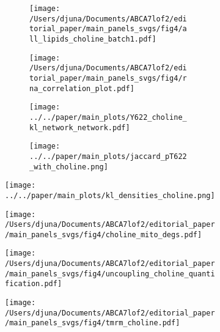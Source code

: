 \documentclass[12pt]{article}
\begin{document}
\begin{figure}[H]
    \begin{subfigure}[t]{.24\textwidth}
        \begin{subfigure}[t]{\textwidth}
            \caption{}
            \texttt{[image: /Users/djuna/Documents/ABCA7lof2/editorial\_paper/main\_panels\_svgs/fig4/all\_lipids\_choline\_batch1.pdf]}        
        \end{subfigure} 
        \begin{subfigure}[t]{\textwidth}
            \caption{}
            \vspace{-0.5cm}
            \centering
            \texttt{[image: /Users/djuna/Documents/ABCA7lof2/editorial\_paper/main\_panels\_svgs/fig4/rna\_correlation\_plot.pdf]}        
        \end{subfigure}  
    \end{subfigure}  
    \hspace{.5cm}
    \begin{subfigure}[t]{.23\textwidth}
        \begin{subfigure}[t]{\textwidth}
            \caption{}
            \texttt{[image: ../../paper/main\_plots/Y622\_choline\_kl\_network\_network.pdf]}        
        \end{subfigure}  
        \begin{subfigure}[t]{\textwidth}
            \caption{}
            \texttt{[image: ../../paper/main\_plots/jaccard\_pT622\_with\_choline.png]}        
        \end{subfigure} 
    \end{subfigure} 
    \hspace{.25cm}
    \begin{subfigure}[t]{.45\textwidth}
        \caption{}
        \texttt{[image: ../../paper/main\_plots/kl\_densities\_choline.png]}        
    \end{subfigure}  
    \begin{subfigure}[t]{.3\textwidth}
        \caption{}
        \texttt{[image: /Users/djuna/Documents/ABCA7lof2/editorial\_paper/main\_panels\_svgs/fig4/choline\_mito\_degs.pdf]}        
    \end{subfigure}  
    \hspace{.4cm} 
    \begin{subfigure}[t]{.2\textwidth}
        \caption{}
        \texttt{[image: /Users/djuna/Documents/ABCA7lof2/editorial\_paper/main\_panels\_svgs/fig4/uncoupling\_choline\_quantification.pdf]}        
    \end{subfigure}  
    \hspace{.4cm}  
    \begin{subfigure}[t]{.4\textwidth}
        \caption{}
        \vspace{-0.15cm}
        \texttt{[image: /Users/djuna/Documents/ABCA7lof2/editorial\_paper/main\_panels\_svgs/fig4/tmrm\_choline.pdf]}        
    \end{subfigure} 
   

\end{figure}
\end{document}
